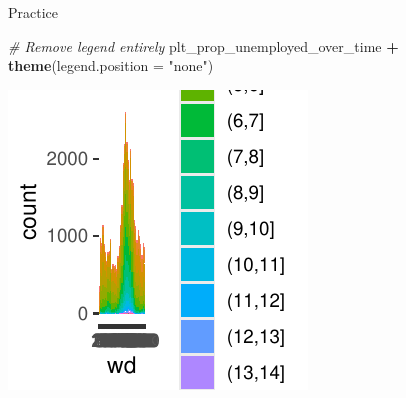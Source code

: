 \documentclass[
  ignorenonframetext,
]{beamer}
\newenvironment{Shaded}{\begin{snugshade}}{\end{snugshade}}
\newcommand{\AttributeTok}[1]{\textcolor[rgb]{0.13,0.29,0.53}{#1}}
\newcommand{\CommentTok}[1]{\textcolor[rgb]{0.56,0.35,0.01}{\textit{#1}}}
\newcommand{\FunctionTok}[1]{\textcolor[rgb]{0.13,0.29,0.53}{\textbf{#1}}}
\newcommand{\NormalTok}[1]{#1}
\newcommand{\SpecialCharTok}[1]{\textcolor[rgb]{0.81,0.36,0.00}{\textbf{#1}}}
\newcommand{\StringTok}[1]{\textcolor[rgb]{0.31,0.60,0.02}{#1}}
\begin{document}
\begin{frame}[fragile]{Practice}
\label{practice-3}

\begin{Shaded}
\begin{Highlighting}[]
\CommentTok{\# Remove legend entirely}
\NormalTok{plt\_prop\_unemployed\_over\_time }\SpecialCharTok{+} \FunctionTok{theme}\NormalTok{(}\AttributeTok{legend.position =} \StringTok{"none"}\NormalTok{)}
\end{Highlighting}
\end{Shaded}

\begin{center}\includegraphics[width=0.5\linewidth]{Figs/unnamed-chunk-69-1} \end{center}
\end{frame}
\end{document}
